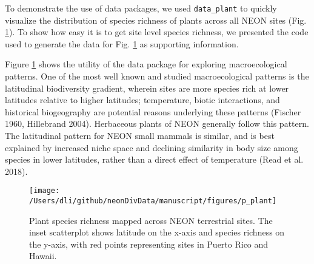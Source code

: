 \documentclass[
  12pt,
]{article}
\begin{document}
To demonstrate the use of data packages, we used \texttt{data\_plant} to quickly visualize the distribution of species richness of plants across all NEON sites (Fig. \ref{fig:Fig2Map}). To show how easy it is to get site level species richness, we presented the code used to generate the data for Fig. \ref{fig:Fig2Map} as supporting information.

Figure \ref{fig:Fig2Map} shows the utility of the data package for exploring macroecological patterns. One of the most well known and studied macroecological patterns is the latitudinal biodiversity gradient, wherein sites are more species rich at lower latitudes relative to higher latitudes; temperature, biotic interactions, and historical biogeography are potential reasons underlying these patterns (Fischer 1960, Hillebrand 2004). Herbaceous plants of NEON generally follow this pattern. The latitudinal pattern for NEON small mammals is similar, and is best explained by increased niche space and declining similarity in body size among species in lower latitudes, rather than a direct effect of temperature (Read et al. 2018).



\begin{figure}

{\centering \texttt{[image: /Users/dli/github/neonDivData/manuscript/figures/p\_plant]} 

}

\caption{Plant species richness mapped across NEON terrestrial sites. The inset scatterplot shows latitude on the x-axis and species richness on the y-axis, with red points representing sites in Puerto Rico and Hawaii.}\label{fig:Fig2Map}
\end{figure}
\end{document}
